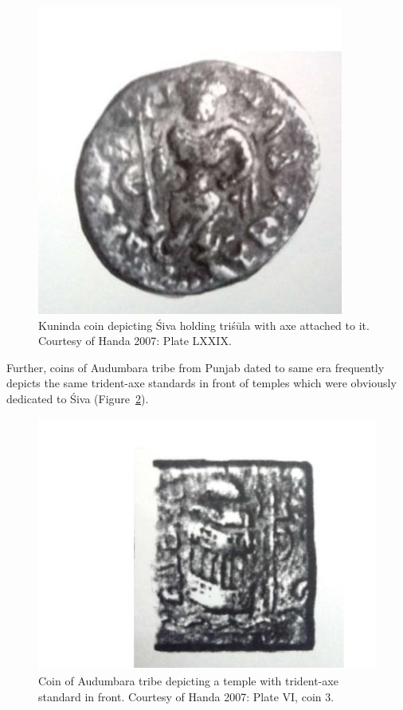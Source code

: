 \begin{figure}[!htbp]
\includegraphics{"images/article-05/art05-fig06.jpg"}
\caption{Kuninda coin depicting Śiva holding triśūla with axe attached to it. Courtesy of Handa 2007: Plate LXXIX.}\label{art5-fig6}
\end{figure}

Further, coins of Audumbara tribe from Punjab dated to same era frequently depicts the same trident-axe standards in front of temples which were obviously dedicated to Śiva (Figure~\ref{art5-fig7}).

\begin{figure}[!htbp]
\includegraphics{"images/article-05/art05-fig07.jpg"}
\caption{Coin of Audumbara tribe depicting a temple with trident-axe standard in front. Courtesy of Handa 2007: Plate VI, coin 3.}\label{art5-fig7}
\end{figure}

